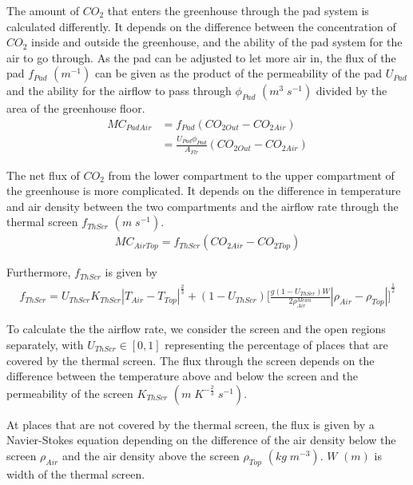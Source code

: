 \documentclass[a4paper]{article}
\begin{document}
The amount of \(CO_2\) that enters the greenhouse through the pad system is calculated differently.
It depends on the difference between the concentration of \(CO_2\) inside and outside the greenhouse, and the ability of the pad system for the air to go through.
As the pad can be adjusted to let more air in, the flux of the pad \(f_{Pad}\) \((m^{-1})\) can be given as the product of the permeability of the pad \(U_{Pad}\) and the ability for the airflow to pass through \(\phi_{Pad}\) \((m^3\;s^{-1})\) divided by the area of the greenhouse floor.
\begin{equation}
  \begin{split}
    MC_{PadAir} & = f_{Pad} (CO_{2 Out} - CO_{2 Air}) \\
    & = \frac{U_{Pad} \phi_{Pad}}{A_{Flr}} (CO_{2 Out} - CO_{2 Air})
  \end{split}
\end{equation}

The net flux of \(CO_2\) from the lower compartment to the upper compartment of the greenhouse is more complicated.
It depends on the difference in temperature and air density between the two compartments and the airflow rate through the thermal screen \(f_{ThScr}\) \((m\;s^{-1})\).
\begin{gather}
  MC_{AirTop} = f_{ThScr} (CO_{2 Air} - CO_{2 Top})
\end{gather}

Furthermore, \(f_{ThScr}\) is given by
\begin{gather}
  f_{ThScr} = U_{ThScr} K_{ThScr} |T_{Air} - T_{Top}| ^{\frac{2}{3}} + (1 - U_{ThScr}) {\Bigg[\frac{g(1 - U_{ThScr})W}{2\rho^{Mean}_{Air}} |\rho_{Air} - \rho_{Top}|\Bigg]}^{\frac{1}{2}}
\end{gather}

To calculate the the airflow rate, we consider the screen and the open regions separately, with \(U_{ThScr} \in [0,1]\) representing the percentage of places that are covered by the thermal screen. The flux through the screen depends on the difference between the temperature above and below the screen and the permeability of the screen \(K_{ThScr}\) \((m\;K^{-\frac{2}{3}}\;s^{-1})\).

At places that are not covered by the thermal screen, the flux is given by a Navier-Stokes equation depending on the difference of the air density below the screen \(\rho_{Air}\) and the air density above the screen \(\rho_{Top}\) \((kg\;m^{-3})\). \(W\) \((m)\) is width of the thermal screen.
\end{document}
